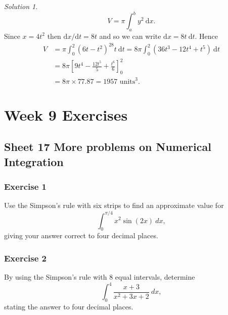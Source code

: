 \documentclass[
  english,
  11pt,
  oneside]{book}
\newcommand{\slide}{}
\theoremstyle{definition}
\theoremstyle{definition}
\theoremstyle{definition}
\theoremstyle{definition}
\theoremstyle{remark}
\newtheorem*{solution}{Solution}
\begin{document}
\begin{solution}
\[
V = \pi\int_a^b y^2\ \mathrm{d}x.
\]
Since \(x=4t^2\) then \(\mathrm{d}x/\mathrm{d}t = 8t\) and so we can write \(\mathrm{d}x = 8t\ \mathrm{d}t\). Hence
\begin{align*}
V& = \pi\int_0^2(6t-t^2)^28t\ \mathrm{d}t = 8\pi\int_0^2(36t^3-12t^4+t^5)\ \mathrm{d}t\\
& = 8\pi\left[9t^4-\frac{12t^5}5+\frac{t^6}6\right]_0^2\\
&= 8\pi\times77.87 = 1957 \text{ units}^3.
\end{align*}
\end{solution}

\begin{slidesonly}

\slide

\hbox{}
\slide

\end{slidesonly}

\chapter*{Week 9 Exercises}\label{week-9-exercises}

\section{Sheet 17 More problems on Numerical Integration}\label{sheet-17-more-problems-on-numerical-integration}

\slide

\subsection*{Exercise 1}\label{exercise-1-8}

Use the Simpson's rule with six strips to find an approximate value for
\[
\int_0^{\pi/4}x^2\sin(2x)\ dx,
\]
giving your answer correct to four decimal places.

\slide

\subsection*{Exercise 2}\label{exercise-2-8}

By using the Simpson's rule with 8 equal intervals, determine
\[
\int_0^4\frac{x+3}{x^2+3x+2}\ dx,
\]
stating the answer to four decimal places.
\end{document}

